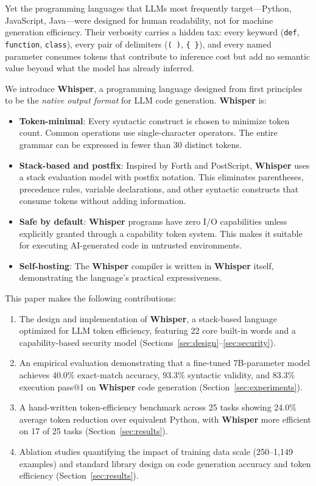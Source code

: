 \documentclass[11pt,a4paper]{article}
\begin{document}
Yet the programming languages that LLMs most frequently target---Python,
JavaScript, Java---were designed for human readability, not for machine
generation efficiency. Their verbosity carries a hidden tax: every keyword
(\texttt{def}, \texttt{function}, \texttt{class}), every pair of delimiters
(\texttt{( )}, \texttt{\{ \}}), and every named parameter consumes tokens that
contribute to inference cost but add no semantic value beyond what the model
has already inferred.

We introduce \textbf{Whisper}, a programming language designed from first
principles to be the \textit{native output format} for LLM code generation.
\textbf{Whisper} is:

\begin{itemize}
\item \textbf{Token-minimal}: Every syntactic construct is chosen to minimize
  token count. Common operations use single-character operators. The entire
  grammar can be expressed in fewer than 30 distinct tokens.
\item \textbf{Stack-based and postfix}: Inspired by Forth and PostScript,
  \textbf{Whisper} uses a stack evaluation model with postfix notation. This
  eliminates parentheses, precedence rules, variable declarations, and other
  syntactic constructs that consume tokens without adding information.
\item \textbf{Safe by default}: \textbf{Whisper} programs have zero I/O
  capabilities unless explicitly granted through a capability token system.
  This makes it suitable for executing AI-generated code in untrusted
  environments.
\item \textbf{Self-hosting}: The \textbf{Whisper} compiler is written in
  \textbf{Whisper} itself, demonstrating the language's practical
  expressiveness.
\end{itemize}

This paper makes the following contributions:

\begin{enumerate}
\item The design and implementation of \textbf{Whisper}, a stack-based language
  optimized for LLM token efficiency, featuring 22 core built-in words and a
  capability-based security model (Sections~\ref{sec:design}--\ref{sec:security}).
\item An empirical evaluation demonstrating that a fine-tuned 7B-parameter
  model achieves 40.0\% exact-match accuracy, 93.3\% syntactic validity,
  and 83.3\% execution pass@1 on \textbf{Whisper} code generation
  (Section~\ref{sec:experiments}).
\item A hand-written token-efficiency benchmark across 25 tasks showing
  24.0\% average token reduction over equivalent Python, with
  \textbf{Whisper} more efficient on 17 of 25 tasks
  (Section~\ref{sec:results}).
\item Ablation studies quantifying the impact of training data scale
  (250--1,149 examples) and standard library design on code generation
  accuracy and token efficiency (Section~\ref{sec:results}).
\end{enumerate}
\end{document}
